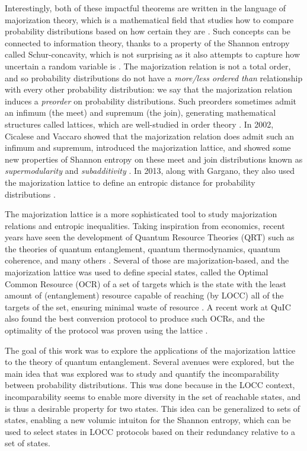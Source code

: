 Interestingly, both of these impactful theorems are written in the language of majorization theory, which is a mathematical field that studies how to compare probability distributions based on how certain they are \cite{marshall_inequalities_2011}. Such concepts can be connected to information theory, thanks to a property of the Shannon entropy called Schur-concavity, which is not surprising as it also attempts to capture how uncertain a random variable is \cite{marshall_inequalities_2011, cover_elements_2006}. The majorization relation is not a total order, and so probability distributions do not have a \textit{more/less ordered than} relationship with every other probability distribution: we say that the majorization relation induces a \textit{preorder} on probability distributions. Such preorders sometimes admit an infimum (the meet) and supremum (the join), generating mathematical structures called lattices, which are well-studied in order theory \cite{davey_introduction_2002}. In 2002, Cicalese and Vaccaro showed that the majorization relation does admit such an infimum and supremum, introduced the majorization lattice, and showed some new properties of Shannon entropy on these meet and join distributions known as \textit{supermodularity} and \textit{subadditivity} \cite{cicalese_supermodularity_2002}. In 2013, along with Gargano, they also used the majorization lattice to define an entropic distance for probability distributions \cite{cicalese_information_2013}.

The majorization lattice is a more sophisticated tool to study majorization relations and entropic inequalities. Taking inspiration from economics, recent years have seen the development of Quantum Resource Theories (QRT) such as the theories of quantum entanglement, quantum thermodynamics, quantum coherence, and many others \cite{chitambar_quantum_2019}. Several of those are majorization-based, and the majorization lattice was used to define special states, called the Optimal Common Resource (OCR) of a set of targets which is the state with the least amount of (entanglement) resource capable of reaching (by LOCC) all of the targets of the set, ensuring minimal waste of resource \cite{bosyk_optimal_2019}. A recent work at QuIC also found the best conversion protocol to produce such OCRs, and the optimality of the protocol was proven using the lattice \cite{deside_probabilistic_2024}.

The goal of this work was to explore the applications of the majorization lattice to the theory of quantum entanglement. Several avenues were explored, but the main idea that was explored was to study and quantify the incomparability between probability distributions. This was done because in the LOCC context, incomparability seems to enable more diversity in the set of reachable states, and is thus a desirable property for two states. This idea can be generalized to sets of states, enabling a new volumic intuiton for the Shannon entropy, which can be used to select states in LOCC protocols based on their redundancy relative to a set of states.

